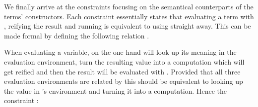 
We finally arrive at the constraints focusing on the semantical counterparts
of the terms' constructors. Each constraint essentially states that evaluating
a term with , reifying the result and running  is equivalent to
using  straight away. This can be made formal by defining the following
relation .


When evaluating a variable, on the one hand 
will look up its meaning in the evaluation environment, turn the resulting value into
a computation which will get reified and then the result will be evaluated with .
Provided that all three evaluation environments are related by  this should
be equivalent to looking up the value in 's environment and turning it into a
computation. Hence the constraint :



